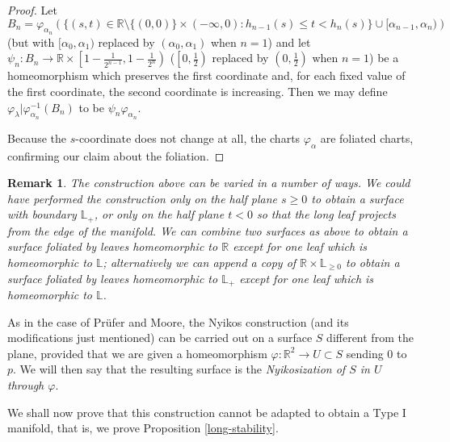 \documentclass{amsart}
\newtheorem{rem}[theorem]{Remark}
\begin{document}
\begin{proof}
  Let $B_n=\varphi_{\alpha_n}\left(\{(s,t)\in\mathbb R\setminus\{(0,0)\}\times(-\infty,0): h_{n-1}(s)\le t<h_n(s)\}\cup[\alpha_{n-1},\alpha_n)\right)$ 
  (but with $[\alpha_0,\alpha_1)$ replaced by $(\alpha_0,\alpha_1)$ when $n=1$) and let 
  $\psi_n:B_n\to\mathbb R\times\left[1-\frac{1}{2^{n-1}},1-\frac{1}{2^n}\right)$ 
  ($\left[0,\frac{1}{2}\right)$ replaced by $\left(0,\frac{1}{2}\right)$ when $n=1$) be a homeomorphism which preserves the first coordinate and, 
  for each fixed value of the first coordinate, the second coordinate is increasing. 
  Then we may define $\varphi_\lambda|\varphi_{\alpha_n}^{-1}(B_n)$ to be $\psi_n\varphi_{\alpha_n}$.

Because the $s$-coordinate does not change at all, the charts $\varphi_\alpha$ are foliated charts, confirming our claim about the foliation.
\end{proof}
\medskip

\begin{rem}\label{remafterNyikos} 
{\rm  The construction above can be varied in a number of ways.  We could have performed the construction only on the half plane $s\ge0$ to obtain a surface with boundary $\mathbb L_+$, or only on the half plane $t<0$ so that the long leaf projects from the edge of the manifold. We can combine two surfaces as above to obtain a surface foliated by leaves homeomorphic to $\mathbb R$ except for one leaf which is homeomorphic to $\mathbb L$; alternatively we can append a copy of $\mathbb R\times\mathbb L_{\ge0}$ to obtain a surface foliated by leaves homeomorphic to $\mathbb L_+$ except for one leaf which is homeomorphic to $\mathbb L$. 
}
\end{rem}

As in the case of Pr\"ufer and Moore, the Nyikos construction (and its modifications just mentioned) can be carried out on a surface $S$ different from the plane, provided that we are given a homeomorphism $\varphi: {\mathbb R}^2\to U\subset S$ sending $0$ to $p$. We will then say that the resulting surface is the {\em Nyikosization of $S$ in $U$ through $\varphi$}.

\smallskip
We shall now prove that this construction cannot be adapted to obtain a Type I manifold, that is, we prove
Proposition \ref{long-stability}.
\end{document}
